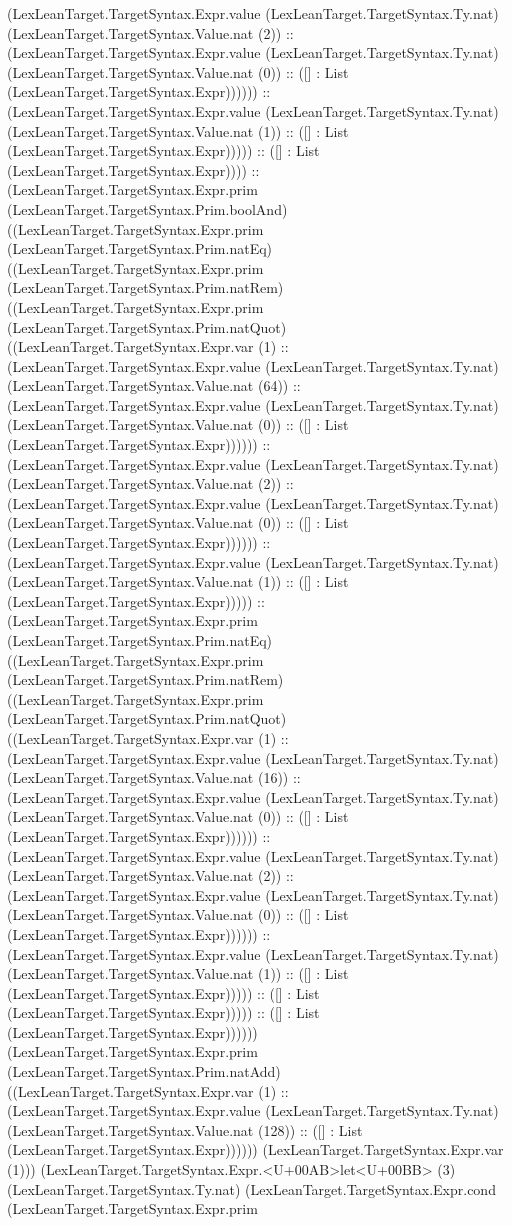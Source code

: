 \documentclass[11pt]{article}
\begin{document}
(LexLeanTarget.TargetSyntax.Expr.value (LexLeanTarget.TargetSyntax.Ty.nat) (LexLeanTarget.TargetSyntax.Value.nat (2)) :: (LexLeanTarget.TargetSyntax.Expr.value (LexLeanTarget.TargetSyntax.Ty.nat) (LexLeanTarget.TargetSyntax.Value.nat (0)) :: ([] : List (LexLeanTarget.TargetSyntax.Expr)))))) :: (LexLeanTarget.TargetSyntax.Expr.value (LexLeanTarget.TargetSyntax.Ty.nat) (LexLeanTarget.TargetSyntax.Value.nat (1)) :: ([] : List (LexLeanTarget.TargetSyntax.Expr))))) :: ([] : List (LexLeanTarget.TargetSyntax.Expr)))) :: (LexLeanTarget.TargetSyntax.Expr.prim (LexLeanTarget.TargetSyntax.Prim.boolAnd) ((LexLeanTarget.TargetSyntax.Expr.prim (LexLeanTarget.TargetSyntax.Prim.natEq) ((LexLeanTarget.TargetSyntax.Expr.prim (LexLeanTarget.TargetSyntax.Prim.natRem) ((LexLeanTarget.TargetSyntax.Expr.prim (LexLeanTarget.TargetSyntax.Prim.natQuot) ((LexLeanTarget.TargetSyntax.Expr.var (1) :: (LexLeanTarget.TargetSyntax.Expr.value (LexLeanTarget.TargetSyntax.Ty.nat) (LexLeanTarget.TargetSyntax.Value.nat (64)) :: (LexLeanTarget.TargetSyntax.Expr.value (LexLeanTarget.TargetSyntax.Ty.nat) (LexLeanTarget.TargetSyntax.Value.nat (0)) :: ([] : List (LexLeanTarget.TargetSyntax.Expr)))))) :: (LexLeanTarget.TargetSyntax.Expr.value (LexLeanTarget.TargetSyntax.Ty.nat) (LexLeanTarget.TargetSyntax.Value.nat (2)) :: (LexLeanTarget.TargetSyntax.Expr.value (LexLeanTarget.TargetSyntax.Ty.nat) (LexLeanTarget.TargetSyntax.Value.nat (0)) :: ([] : List (LexLeanTarget.TargetSyntax.Expr)))))) :: (LexLeanTarget.TargetSyntax.Expr.value (LexLeanTarget.TargetSyntax.Ty.nat) (LexLeanTarget.TargetSyntax.Value.nat (1)) :: ([] : List (LexLeanTarget.TargetSyntax.Expr))))) :: (LexLeanTarget.TargetSyntax.Expr.prim (LexLeanTarget.TargetSyntax.Prim.natEq) ((LexLeanTarget.TargetSyntax.Expr.prim (LexLeanTarget.TargetSyntax.Prim.natRem) ((LexLeanTarget.TargetSyntax.Expr.prim (LexLeanTarget.TargetSyntax.Prim.natQuot) ((LexLeanTarget.TargetSyntax.Expr.var (1) :: (LexLeanTarget.TargetSyntax.Expr.value (LexLeanTarget.TargetSyntax.Ty.nat) (LexLeanTarget.TargetSyntax.Value.nat (16)) :: (LexLeanTarget.TargetSyntax.Expr.value (LexLeanTarget.TargetSyntax.Ty.nat) (LexLeanTarget.TargetSyntax.Value.nat (0)) :: ([] : List (LexLeanTarget.TargetSyntax.Expr)))))) :: (LexLeanTarget.TargetSyntax.Expr.value (LexLeanTarget.TargetSyntax.Ty.nat) (LexLeanTarget.TargetSyntax.Value.nat (2)) :: (LexLeanTarget.TargetSyntax.Expr.value (LexLeanTarget.TargetSyntax.Ty.nat) (LexLeanTarget.TargetSyntax.Value.nat (0)) :: ([] : List (LexLeanTarget.TargetSyntax.Expr)))))) :: (LexLeanTarget.TargetSyntax.Expr.value (LexLeanTarget.TargetSyntax.Ty.nat) (LexLeanTarget.TargetSyntax.Value.nat (1)) :: ([] : List (LexLeanTarget.TargetSyntax.Expr))))) :: ([] : List (LexLeanTarget.TargetSyntax.Expr))))) :: ([] : List (LexLeanTarget.TargetSyntax.Expr)))))) (LexLeanTarget.TargetSyntax.Expr.prim (LexLeanTarget.TargetSyntax.Prim.natAdd) ((LexLeanTarget.TargetSyntax.Expr.var (1) :: (LexLeanTarget.TargetSyntax.Expr.value (LexLeanTarget.TargetSyntax.Ty.nat) (LexLeanTarget.TargetSyntax.Value.nat (128)) :: ([] : List (LexLeanTarget.TargetSyntax.Expr)))))) (LexLeanTarget.TargetSyntax.Expr.var (1))) (LexLeanTarget.TargetSyntax.Expr.<U+00AB>let<U+00BB> (3) (LexLeanTarget.TargetSyntax.Ty.nat) (LexLeanTarget.TargetSyntax.Expr.cond (LexLeanTarget.TargetSyntax.Expr.prim 
\end{document}
